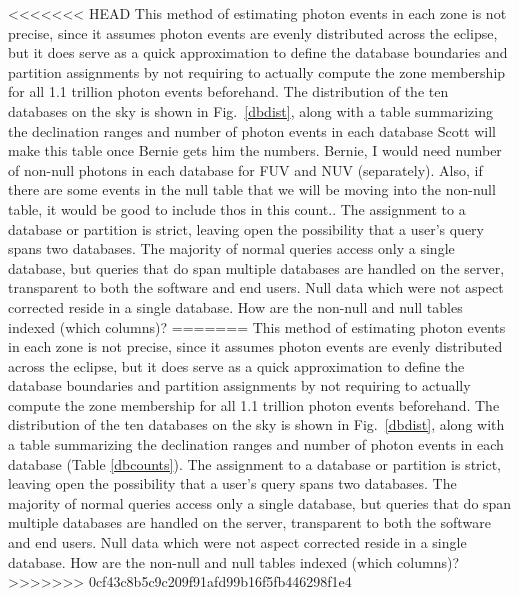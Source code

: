 \documentclass[5p]{elsarticle}
\begin{document}
<<<<<<< HEAD
This method of estimating photon events in each zone is not precise, since it assumes photon events are evenly distributed across the eclipse, but it does serve as a quick approximation to define the database boundaries and partition assignments by not requiring to actually compute the zone membership for all 1.1 trillion photon events beforehand.  The distribution of the ten databases on the sky is shown in Fig.\ \ref{dbdist}, along with a table summarizing the declination ranges and number of photon events in each database {\color{red}Scott will make this table once Bernie gets him the numbers.  Bernie, I would need number of non-null photons in each database for FUV and NUV (separately).  Also, if there are some events in the null table that we will be moving into the non-null table, it would be good to include thos in this count.}. The assignment to a database or partition is strict, leaving open the possibility that a user's query spans two databases. The majority of normal queries access only a single database, but queries that do span multiple databases are handled on the server, transparent to both the software and end users. Null data which were not aspect corrected reside in a single database.  {\color{red}How are the non-null and null tables indexed (which columns)?}
=======
This method of estimating photon events in each zone is not precise, since it assumes photon events are evenly distributed across the eclipse, but it does serve as a quick approximation to define the database boundaries and partition assignments by not requiring to actually compute the zone membership for all 1.1 trillion photon events beforehand.  The distribution of the ten databases on the sky is shown in Fig.\ \ref{dbdist}, along with a table summarizing the declination ranges and number of photon events in each database (Table \ref{dbcounts}). The assignment to a database or partition is strict, leaving open the possibility that a user's query spans two databases. The majority of normal queries access only a single database, but queries that do span multiple databases are handled on the server, transparent to both the software and end users. Null data which were not aspect corrected reside in a single database.  {\color{red}How are the non-null and null tables indexed (which columns)?}
>>>>>>> 0cf43c8b5c9c209f91afd99b16f5fb446298f1e4
\end{document}
